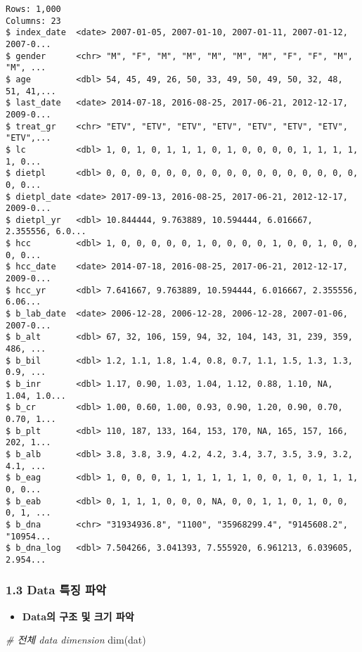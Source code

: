 \documentclass[
]{article}
\newenvironment{Shaded}{\begin{snugshade}}{\end{snugshade}}
\newcommand{\CommentTok}[1]{\textcolor[rgb]{0.56,0.35,0.01}{\textit{#1}}}
\newcommand{\FunctionTok}[1]{\textcolor[rgb]{0.00,0.00,0.00}{#1}}
\newcommand{\NormalTok}[1]{#1}
\providecommand{\tightlist}{%
  \setlength{\itemsep}{0pt}\setlength{\parskip}{0pt}}
\begin{document}
\begin{verbatim}
Rows: 1,000
Columns: 23
$ index_date  <date> 2007-01-05, 2007-01-10, 2007-01-11, 2007-01-12, 2007-0...
$ gender      <chr> "M", "F", "M", "M", "M", "M", "M", "F", "F", "M", "M", ...
$ age         <dbl> 54, 45, 49, 26, 50, 33, 49, 50, 49, 50, 32, 48, 51, 41,...
$ last_date   <date> 2014-07-18, 2016-08-25, 2017-06-21, 2012-12-17, 2009-0...
$ treat_gr    <chr> "ETV", "ETV", "ETV", "ETV", "ETV", "ETV", "ETV", "ETV",...
$ lc          <dbl> 1, 0, 1, 0, 1, 1, 1, 0, 1, 0, 0, 0, 0, 1, 1, 1, 1, 1, 0...
$ dietpl      <dbl> 0, 0, 0, 0, 0, 0, 0, 0, 0, 0, 0, 0, 0, 0, 0, 0, 0, 0, 0...
$ dietpl_date <date> 2017-09-13, 2016-08-25, 2017-06-21, 2012-12-17, 2009-0...
$ dietpl_yr   <dbl> 10.844444, 9.763889, 10.594444, 6.016667, 2.355556, 6.0...
$ hcc         <dbl> 1, 0, 0, 0, 0, 0, 1, 0, 0, 0, 0, 1, 0, 0, 1, 0, 0, 0, 0...
$ hcc_date    <date> 2014-07-18, 2016-08-25, 2017-06-21, 2012-12-17, 2009-0...
$ hcc_yr      <dbl> 7.641667, 9.763889, 10.594444, 6.016667, 2.355556, 6.06...
$ b_lab_date  <date> 2006-12-28, 2006-12-28, 2006-12-28, 2007-01-06, 2007-0...
$ b_alt       <dbl> 67, 32, 106, 159, 94, 32, 104, 143, 31, 239, 359, 486, ...
$ b_bil       <dbl> 1.2, 1.1, 1.8, 1.4, 0.8, 0.7, 1.1, 1.5, 1.3, 1.3, 0.9, ...
$ b_inr       <dbl> 1.17, 0.90, 1.03, 1.04, 1.12, 0.88, 1.10, NA, 1.04, 1.0...
$ b_cr        <dbl> 1.00, 0.60, 1.00, 0.93, 0.90, 1.20, 0.90, 0.70, 0.70, 1...
$ b_plt       <dbl> 110, 187, 133, 164, 153, 170, NA, 165, 157, 166, 202, 1...
$ b_alb       <dbl> 3.8, 3.8, 3.9, 4.2, 4.2, 3.4, 3.7, 3.5, 3.9, 3.2, 4.1, ...
$ b_eag       <dbl> 1, 0, 0, 0, 1, 1, 1, 1, 1, 1, 0, 0, 1, 0, 1, 1, 1, 0, 0...
$ b_eab       <dbl> 0, 1, 1, 1, 0, 0, 0, NA, 0, 0, 1, 1, 0, 1, 0, 0, 0, 1, ...
$ b_dna       <chr> "31934936.8", "1100", "35968299.4", "9145608.2", "10954...
$ b_dna_log   <dbl> 7.504266, 3.041393, 7.555920, 6.961213, 6.039605, 2.954...
\end{verbatim}

\hypertarget{data-uxd2b9uxc9d5-uxd30cuxc545}{%
\subsubsection{1.3 Data 특징
파악}\label{data-uxd2b9uxc9d5-uxd30cuxc545}}

\begin{itemize}
\tightlist
\item
  \textbf{Data의 구조 및 크기 파악}
\end{itemize}

\begin{Shaded}
\begin{Highlighting}[]
\CommentTok{\# 전체 data dimension}
\FunctionTok{dim}\NormalTok{(dat)}
\end{Highlighting}
\end{Shaded}
\end{document}
